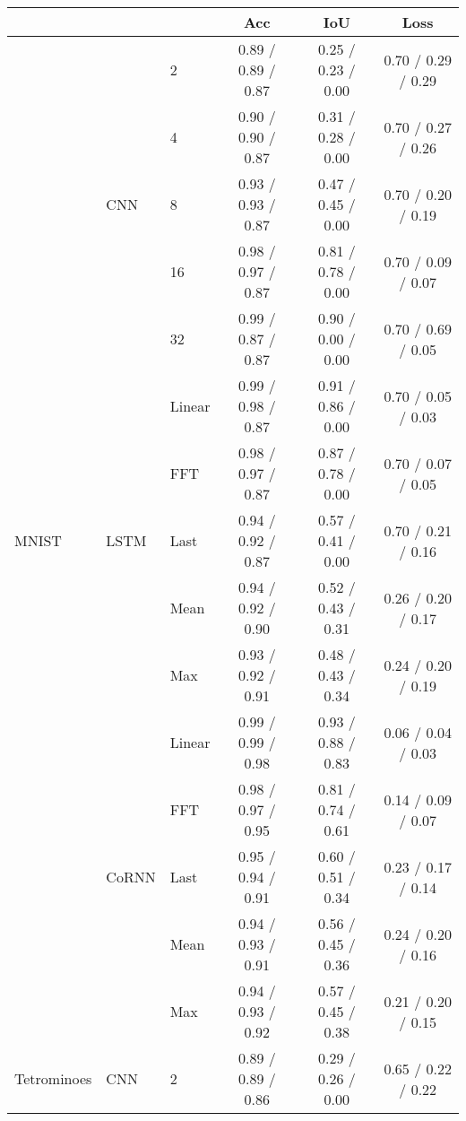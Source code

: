 \begin{table*}[ht!]
\centering
\begin{minipage}{0.99\linewidth}
\centering
\begin{tabular}{lllccc}
\toprule
 &  &  & Acc & IoU & Loss \\
\midrule
\multirow{15}{*}{MNIST} 
 & \multirow{5}{*}{CNN} 
 & 2 
 & 0.89 / 0.89 / 0.87 
 & 0.25 / 0.23 / 0.00 
 & 0.70 / 0.29 / 0.29 
\\
 &  & 4 
 & 0.90 / 0.90 / 0.87 
 & 0.31 / 0.28 / 0.00 
 & 0.70 / 0.27 / 0.26 
\\
 &  & 8 
 & 0.93 / 0.93 / 0.87 
 & 0.47 / 0.45 / 0.00 
 & 0.70 / 0.20 / 0.19 
\\
 &  & 16 
 & 0.98 / 0.97 / 0.87 
 & 0.81 / 0.78 / 0.00 
 & 0.70 / 0.09 / 0.07 
\\
 &  & 32 
 & 0.99 / 0.87 / 0.87 
 & 0.90 / 0.00 / 0.00 
 & 0.70 / 0.69 / 0.05 
\\
\cline{2-6}
 & \multirow{5}{*}{LSTM} 
 & Linear 
 & 0.99 / 0.98 / 0.87 
 & 0.91 / 0.86 / 0.00 
 & 0.70 / 0.05 / 0.03 
\\
 &  & FFT 
 & 0.98 / 0.97 / 0.87 
 & 0.87 / 0.78 / 0.00 
 & 0.70 / 0.07 / 0.05 
\\
 &  & Last 
 & 0.94 / 0.92 / 0.87 
 & 0.57 / 0.41 / 0.00 
 & 0.70 / 0.21 / 0.16 
\\
 &  & Mean 
 & 0.94 / 0.92 / 0.90 
 & 0.52 / 0.43 / 0.31 
 & 0.26 / 0.20 / 0.17 
\\
 &  & Max 
 & 0.93 / 0.92 / 0.91 
 & 0.48 / 0.43 / 0.34 
 & 0.24 / 0.20 / 0.19 
\\
\cline{2-6}
 & \multirow{5}{*}{CoRNN} 
 & Linear 
 & 0.99 / 0.99 / 0.98 
 & 0.93 / 0.88 / 0.83 
 & 0.06 / 0.04 / 0.03 
\\
 &  & FFT 
 & 0.98 / 0.97 / 0.95 
 & 0.81 / 0.74 / 0.61 
 & 0.14 / 0.09 / 0.07 
\\
 &  & Last 
 & 0.95 / 0.94 / 0.91 
 & 0.60 / 0.51 / 0.34 
 & 0.23 / 0.17 / 0.14 
\\
 &  & Mean 
 & 0.94 / 0.93 / 0.91 
 & 0.56 / 0.45 / 0.36 
 & 0.24 / 0.20 / 0.16 
\\
 &  & Max 
 & 0.94 / 0.93 / 0.92 
 & 0.57 / 0.45 / 0.38 
 & 0.21 / 0.20 / 0.15 
\\
\midrule
\multirow{15}{*}{Tetrominoes} 
 & \multirow{5}{*}{CNN} 
 & 2 
 & 0.89 / 0.89 / 0.86 
 & 0.29 / 0.26 / 0.00 
 & 0.65 / 0.22 / 0.22 
\\

\end{tabular}
\end{minipage}
\end{table*}
